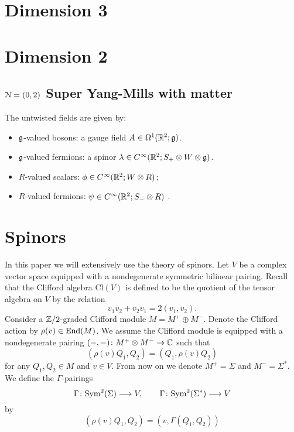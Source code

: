 \documentclass[10pt, oneside]{article}
\newcommand{\Cl}{\mathrm{Cl}}
\begin{document}
\section{Dimension 3}


\section{Dimension 2}


\subsection{$\mathcal N=(0,2)$ Super Yang-Mills with matter}

The untwisted fields are given by:
\begin{itemize}
\item $\mathfrak g$-valued bosons: a gauge field $A \in \Omega^1(\mathbb R^2;\mathfrak g)$.
\item $\mathfrak g$-valued fermions: a spinor $\lambda \in C^\infty(\mathbb R^2 ; S_+ \otimes W \otimes \mathfrak g)$. 
\item $R$-valued scalars: $\phi \in C^\infty(\mathbb R^2 ; W \otimes R)$;
\item $R$-valued fermions: $\psi \in C^\infty(\mathbb R^2 ; S_- \otimes R)$ .
\end{itemize}



\appendix

\section{Spinors}
\label{sect:spinors}

In this paper we will extensively use the theory of spinors. Let $V$ be a complex vector space equipped with a nondegenerate symmetric bilinear pairing. Recall that the Clifford algebra $\Cl(V)$ is defined to be the quotient of the tensor algebra on $V$ by the relation
\[v_1 v_2 + v_2 v_1 = 2(v_1, v_2).\]
Consider a $\mathbb Z/2$-graded Clifford module $M=M^+\oplus M^-$. Denote the Clifford action by $\rho(v)\in\operatorname{End}(M)$. We assume the Clifford module is equipped with a nondegenerate pairing $(-, -)\colon M^+\otimes M^-\rightarrow \mathbb C$ such that
\[(\rho(v) Q_1, Q_2) = (Q_1, \rho(v) Q_2)\]
for any $Q_1, Q_2\in M$ and $v\in V$. From now on we denote $M^+=\Sigma$ and $M^-=\Sigma^*$. We define the $\Gamma$-pairings
\[\Gamma\colon{\rm Sym}^2(\Sigma)\longrightarrow V,\qquad \Gamma\colon{\rm Sym}^2(\Sigma^*)\longrightarrow V\]
by
\begin{equation}
(\rho(v) Q_1, Q_2) = (v, \Gamma(Q_1, Q_2))
\label{eq:Gammaspinorpairing}
\end{equation}
\end{document}
